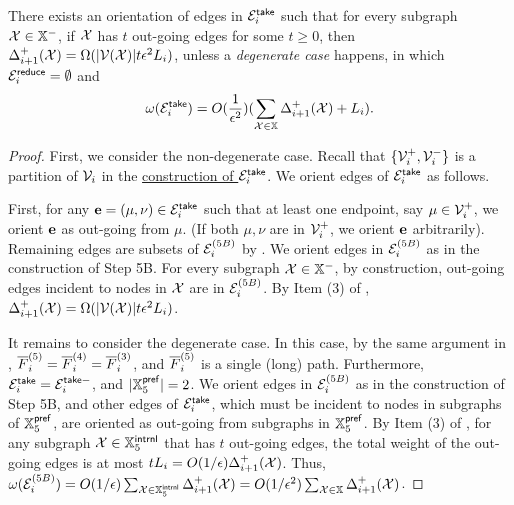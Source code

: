 \begin{lemma}\label{lm:Item4Clustering1E}  There exists an orientation of edges in $\mathcal{E}_i^{\mathsf{take}}$ such that for every subgraph $\mathcal{X} \in \mathbb{X}^{-}$, if $\mathcal{X}$ has $t$ out-going edges for some $t\geq 0$, then $\Delta^+_{i+1}(\mathcal{X}) =\Omega(|\mathcal{V}(\mathcal{X})|t\epsilon^2 L_i)$, unless a \emph{degenerate case} happens, in which  $\mathcal{E}^{\mathsf{reduce}}_i = \emptyset$ and  $$\omega(\mathcal{E}_i^{\mathsf{take}}) = O(\frac{1}{\epsilon^2})(\sum_{\mathcal{X} \in \mathbb{X}} \Delta_{i+1}^+(\mathcal{X}) + L_i).$$
\end{lemma}
\begin{proof} First, we consider the non-degenerate case. Recall that $\{\mathcal{V}^+_i,\mathcal{V}^-_i\}$ is a partition of $\mathcal{V}_i$ in the \hyperlink{EiPartition1E}{construction of $\mathcal{E}_i^{\mathsf{take}}$}. We orient edges of $\mathcal{E}_i^{\mathsf{take}}$ as follows.
	
	First, for any $\mathbf{e} = (\mu,\nu)\in \mathcal{E}_i^{\mathsf{take}}$ such that at least one endpoint, say $\mu \in \mathcal{V}_i^+$, we orient $\mathbf{e}$ as out-going from $\mu$. (If both $\mu,\nu$ are in $\mathcal{V}_i^+$, we orient $\mathbf{e}$ arbitrarily).  Remaining  edges are subsets  of $\mathcal{E}_i^{(5B)}$ by . We orient edges in  $\mathcal{E}_i^{(5B)}$ as in the construction of Step 5B.	For every subgraph  $\mathcal{X} \in \mathbb{X}^{-}$, by construction, out-going edges incident to nodes in $\mathcal{X}$ are in $\mathcal{E}_i^{(5B)}$. By Item (3) of , $\Delta^+_{i+1}(\mathcal{X}) =\Omega(|\mathcal{V}(\mathcal{X})|t\epsilon^2 L_i)$.
	
	
	It remains to consider the degenerate case. In this case,  by the same argument in , 	$\overline{F}^{(5)}_i = \overline{F}^{(4)}_i = \overline{F}^{(3)}_i$, and $\overline{F}^{(5)}_i$  is a single (long) path. Furthermore, $\mathcal{E}_i^{\mathsf{take}} = \mathcal{E}_i^{\mathsf{take}-}$, and $|\mathbb{X}_5^{\mathsf{pref}}| = 2$.  We orient edges in  $\mathcal{E}_i^{(5B)}$ as in the construction of Step 5B, and other edges of $\mathcal{E}_i^{\mathsf{take}}$, which must be incident to nodes in subgraphs of $\mathbb{X}_5^{\mathsf{pref}}$, are oriented as out-going from subgraphs in  $\mathbb{X}_5^{\mathsf{pref}}$. 	By Item (3) of , for any subgraph $\mathcal{X} \in \mathbb{X}^{\mathsf{intrnl}}_5$ that has $t$ out-going edges, the total weight of the out-going edges is at  most $tL_i = O(1/\epsilon) \Delta^+_{i+1}(\mathcal{X})$. Thus, $\omega(\mathcal{E}_i^{(5B)}) =  O(1/\epsilon) \sum_{\mathcal{X} \in \mathbb{X}^{\mathsf{intrnl}}_5}\Delta^+_{i+1}(\mathcal{X}) = O(1/\epsilon^2)\sum_{\mathcal{X} \in \mathbb{X}}\Delta^+_{i+1}(\mathcal{X}) $.
	

\end{proof}
